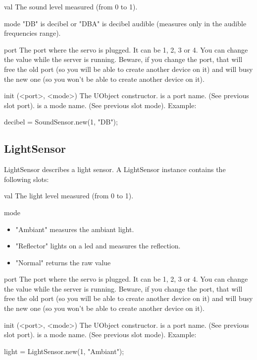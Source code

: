 \begin{urbiscriptapi}

\item[val] The sound level measured (from 0 to 1).

\item[mode] "DB" is decibel or "DBA" is decibel audible (measures only in
  the audible frequencies range).

\item[port] The port where the servo is plugged. It can be 1, 2, 3 or 4. You
  can change the value while the server is running. Beware, if you change
  the port, that will free the old port (so you will be able to create
  another device on it) and will busy the new one (so you won't be able to
  create another device on it).


\item[init](<port>, <mode>) The UObject constructor.  is a port
  name. (See previous slot port).  is a mode name. (See
  previous slot mode). Example:
\begin{urbiunchecked}
  decibel = SoundSensor.new(1, "DB");
\end{urbiunchecked}

\end{urbiscriptapi}

\subsection{LightSensor}
LightSensor describes a light sensor. A LightSensor instance contains the
following slots:

\begin{urbiscriptapi}

\item[val]
The light level measured (from 0 to 1).

\item[mode]
  \begin{itemize}
  \item "Ambiant" measures the ambiant light.
  \item "Reflector" lights on a led and measures the reflection.
  \item "Normal" returns the raw value
  \end{itemize}

\item[port] The port where the servo is plugged. It can be 1, 2, 3 or 4. You
  can change the value while the server is running. Beware, if you change
  the port, that will free the old port (so you will be able to create
  another device on it) and will busy the new one (so you won't be able to
  create another device on it).

\item[init](<port>, <mode>) The UObject constructor.  is a port
  name. (See previous slot port).  is a mode name. (See
  previous slot mode). Example:
\begin{urbiunchecked}
  light = LightSensor.new(1, "Ambiant");
\end{urbiunchecked}
\end{urbiscriptapi}

